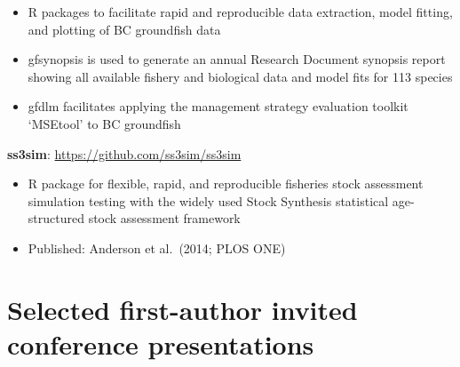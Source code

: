 \begin{itemize}
\tightlist
\item
  R packages to facilitate rapid and reproducible data extraction, model
  fitting, and plotting of BC groundfish data
\item
  gfsynopsis is used to generate an annual Research Document synopsis
  report showing all available fishery and biological data and model
  fits for 113 species
\item
  gfdlm facilitates applying the management strategy evaluation toolkit
  `MSEtool' to BC groundfish
\end{itemize}

\textbf{ss3sim}: \url{https://github.com/ss3sim/ss3sim}

\begin{itemize}
\tightlist
\item
  R package for flexible, rapid, and reproducible fisheries stock
  assessment simulation testing with the widely used Stock Synthesis
  statistical age-structured stock assessment framework
\item
  Published: Anderson et al.\ (2014; PLOS ONE)
\end{itemize}

\hypertarget{selected-first-author-invited-conference-presentations}{%
\section{Selected first-author invited conference
presentations}\label{selected-first-author-invited-conference-presentations}}


